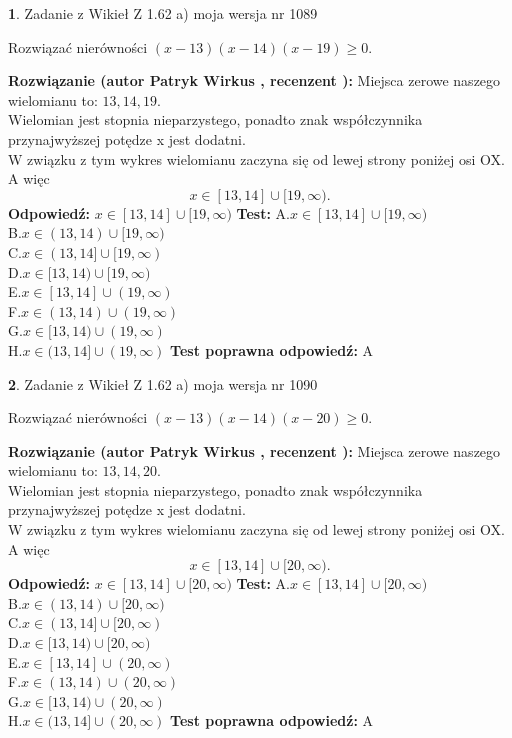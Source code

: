 \documentclass[12pt, a4paper]{article}
\theoremstyle{definition} %
\newtheorem{zad}{}
\newcommand{\zadStart}[1]{\begin{zad}#1\newline}
\newcommand{\zadStop}{\end{zad}}
\newcommand{\rozwStart}[2]{\noindent \textbf{Rozwiązanie (autor #1 , recenzent #2): }\newline}
\newcommand{\rozwStop}{\newline}
\newcommand{\odpStart}{\noindent \textbf{Odpowiedź:}\newline}
\newcommand{\odpStop}{\newline}
\newcommand{\testStart}{\noindent \textbf{Test:}\newline}
\newcommand{\testStop}{\newline}
\newcommand{\kluczStart}{\noindent \textbf{Test poprawna odpowiedź:}\newline}
\newcommand{\kluczStop}{\newline}
\begin{document}
\zadStart{Zadanie z Wikieł Z 1.62 a) moja wersja nr 1089}

Rozwiązać nierówności $(x-13)(x-14)(x-19)\ge0$.
\zadStop
\rozwStart{Patryk Wirkus}{}
Miejsca zerowe naszego wielomianu to: $13, 14, 19$.\\
Wielomian jest stopnia nieparzystego, ponadto znak współczynnika przy\linebreak najwyższej potędze x jest dodatni.\\ W związku z tym wykres wielomianu zaczyna się od lewej strony poniżej osi OX. A więc $$x \in [13,14] \cup [19,\infty).$$
\rozwStop
\odpStart
$x \in [13,14] \cup [19,\infty)$
\odpStop
\testStart
A.$x \in [13,14] \cup [19,\infty)$\\
B.$x \in (13,14) \cup [19,\infty)$\\
C.$x \in (13,14] \cup [19,\infty)$\\
D.$x \in [13,14) \cup [19,\infty)$\\
E.$x \in [13,14] \cup (19,\infty)$\\
F.$x \in (13,14) \cup (19,\infty)$\\
G.$x \in [13,14) \cup (19,\infty)$\\
H.$x \in (13,14] \cup (19,\infty)$
\testStop
\kluczStart
A
\kluczStop



\zadStart{Zadanie z Wikieł Z 1.62 a) moja wersja nr 1090}

Rozwiązać nierówności $(x-13)(x-14)(x-20)\ge0$.
\zadStop
\rozwStart{Patryk Wirkus}{}
Miejsca zerowe naszego wielomianu to: $13, 14, 20$.\\
Wielomian jest stopnia nieparzystego, ponadto znak współczynnika przy\linebreak najwyższej potędze x jest dodatni.\\ W związku z tym wykres wielomianu zaczyna się od lewej strony poniżej osi OX. A więc $$x \in [13,14] \cup [20,\infty).$$
\rozwStop
\odpStart
$x \in [13,14] \cup [20,\infty)$
\odpStop
\testStart
A.$x \in [13,14] \cup [20,\infty)$\\
B.$x \in (13,14) \cup [20,\infty)$\\
C.$x \in (13,14] \cup [20,\infty)$\\
D.$x \in [13,14) \cup [20,\infty)$\\
E.$x \in [13,14] \cup (20,\infty)$\\
F.$x \in (13,14) \cup (20,\infty)$\\
G.$x \in [13,14) \cup (20,\infty)$\\
H.$x \in (13,14] \cup (20,\infty)$
\testStop
\kluczStart
A
\kluczStop
\end{document}
